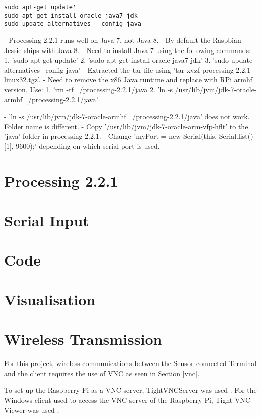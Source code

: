 \begin{lstlisting}
sudo apt-get update'
sudo apt-get install oracle-java7-jdk
sudo update-alternatives --config java
\end{lstlisting}




- Processing 2.2.1 runs well on Java 7, not Java 8. 
- By default the Raspbian Jessie ships with Java 8. 
- Need to install Java 7 using the following commands: 
1. 'sudo apt-get update'
2. 'sudo apt-get install oracle-java7-jdk' 
3. 'sudo update-alternatives --config java'
- Extracted the tar file using 'tar xvzf processing-2.2.1-linux32.tgz'. 
- Need to remove the x86 Java runtime and replace with RPi armhf version. Use: 
1. 'rm -rf ~/processing-2.2.1/java
2. 'ln -s /usr/lib/jvm/jdk-7-oracle-armhf ~/processing-2.2.1/java'




- 'ln -s /usr/lib/jvm/jdk-7-oracle-armhf ~/processing-2.2.1/java' does not work. Folder name is different. 
- Copy '/usr/lib/jvm/jdk-7-oracle-arm-vfp-hflt' to the 'java' folder in processing-2.2.1. 
- Change 'myPort = new Serial(this, Serial.list()[1], 9600);' depending on which serial port is used. 


\section{Processing 2.2.1}

\section{Serial Input}

\section{Code}




\section{Visualisation}

\section{Wireless Transmission}
 
For this project, wireless communications between the Sensor-connected Terminal and the client requires the use of VNC as seen in Section \ref{vnc}. 

To set up the Raspberry Pi as a VNC server, TightVNCServer was used . For the Windows client used to access the VNC server of the Raspberry Pi, Tight VNC Viewer was used \cite{windowstightvnc}. 

